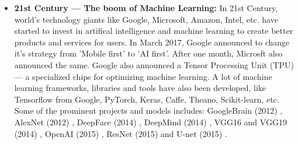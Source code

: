 \begin{itemize}
  \item  \textbf{21st Century — The boom of Machine Learning:} In 21st Century, world's technology giants like Google, Microsoft, Amazon, Intel, etc. have started to invest in artifical intelligence and machine learning to create better products and services for users. In March 2017, Google announced to change it's strategy from 'Mobile first' to 'AI first'. After one month, Microsft also announced the same. Google also announced a Tensor Processing Unit (TPU) — a specialized chips for optimizing machine learning. A lot of machine learning frameworks, libraries and tools have also been developed, like Tensorflow from Google, PyTorch, Keras, Caffe, Theano, Scikit-learn, etc. Some of the prominent projects and models includes: GoogleBrain (2012) \cite{googlebrain}, AlexNet (2012) \cite{alexnet}, DeepFace (2014) \cite{deepface}, DeepMind (2014) \cite{deepmind}, VGG16 and VGG19  (2014) \cite{vgg_19}, OpenAI (2015) \cite{openai}, ResNet (2015) \cite{resnet} and U-net (2015) \cite{unet}.
\end{itemize}

